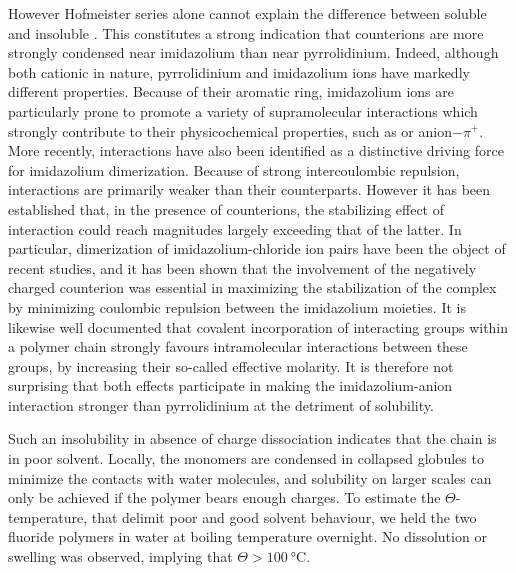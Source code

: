 \documentclass[journal=jacsat,manuscript=article]{achemso}
\begin{document}
However Hofmeister series alone cannot explain the difference between soluble  and insoluble . This constitutes a strong indication that counterions are more strongly condensed near imidazolium than near pyrrolidinium. Indeed, although both cationic in nature, pyrrolidinium and imidazolium ions have markedly different properties. Because of their aromatic ring, imidazolium ions are particularly prone to promote a variety of supramolecular interactions which strongly contribute to their physicochemical properties, such as \ce{\pi+-\pi} or anion$-\pi^+$.  More recently, \ce{\pi+-\pi+} interactions have also been identified as a distinctive driving force for imidazolium dimerization\cite{Geronimo2011}. Because of strong intercoulombic repulsion, \ce{\pi+-\pi+} interactions are primarily weaker than their \ce{\pi-\pi} counterparts. However it has been established that, in the presence of counterions, the stabilizing effect of \ce{\pi+-\pi+} interaction could reach magnitudes largely exceeding that of the latter\cite{Geronimo2011}. In particular, dimerization of imidazolium-chloride ion pairs have been the object of recent studies, and it has been shown that the involvement of the negatively charged counterion was essential in maximizing the stabilization of the \ce{\pi+-\pi+} complex by minimizing coulombic repulsion between the imidazolium moieties\cite{Matthews2014,Gao2015a}. It is likewise well documented that covalent incorporation of interacting groups within a polymer chain strongly favours intramolecular interactions between these groups, by increasing their so-called effective molarity\cite{Li2003,Mulder2004,Huerta2013}. It is therefore not surprising that both effects participate in making the imidazolium-anion interaction stronger than pyrrolidinium at the detriment of solubility.

Such an insolubility in absence of charge dissociation indicates that the chain is in poor solvent. Locally, the monomers are condensed in collapsed globules to minimize the contacts with water molecules, and solubility on larger scales can only be achieved if the polymer bears enough charges\cite{Khokhlov1980,Raphael1990}. To estimate the $\Theta$-temperature, that delimit poor and good solvent behaviour, we held the two fluoride polymers in water at boiling temperature overnight. No dissolution or swelling was observed, implying that $\Theta>\SI{100}{\celsius}$. %
\end{document}
